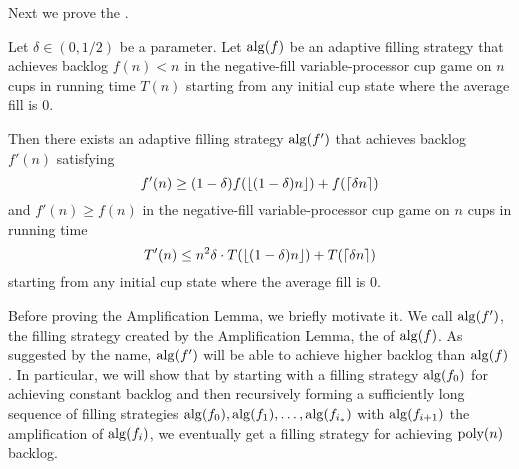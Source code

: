 
Next we prove the .
\begin{lemma}\label{lem:adaptiveAmplification}
  Let $\delta\in(0,1/2)$ be a parameter.
  Let $\operatorname{\text{\textup{alg}}}(f)$ be an adaptive filling strategy that 
  achieves backlog $f(n) < n$ in the negative-fill variable-processor cup game
  on $n$ cups in running time $T(n)$ starting from any initial
  cup state where the average fill is $0$.

  Then there exists an adaptive filling strategy $\operatorname{\text{\textup{alg}}}(f')$ that
  achieves backlog $f'(n)$ satisfying 
  $$f'(n) \ge (1-\delta)f(\left\lfloor (1-\delta)n \right\rfloor) + f(\left\lceil \delta n \right\rceil) $$
  and $f'(n) \ge f(n)$
  in the negative-fill variable-processor cup game on $n$ cups in running time 
  $$T'(n) \le n^2 \delta \cdot T(\left\lfloor (1-\delta)n \right\rfloor) + T(\left\lceil \delta n \right\rceil)$$
  starting from any initial cup state where the average fill is $0$.
\end{lemma}

Before proving the Amplification Lemma, we briefly motivate it. 
We call $\operatorname{\text{\textup{alg}}}(f')$, the filling strategy created by the Amplification
Lemma, the  of $\operatorname{\text{\textup{alg}}}(f)$.
As suggested by the name, $\operatorname{\text{\textup{alg}}}(f')$ will be able to achieve
higher backlog than $\operatorname{\text{\textup{alg}}}(f)$. In particular, we
will show that by starting with a filling strategy $\operatorname{\text{\textup{alg}}}(f_0)$ for achieving
constant backlog and then recursively forming a sufficiently
long sequence of filling strategies $\operatorname{\text{\textup{alg}}}(f_0), \operatorname{\text{\textup{alg}}}(f_1),
\ldots, \operatorname{\text{\textup{alg}}}(f_{i_*})$ with
$\operatorname{\text{\textup{alg}}}(f_{i+1})$ the amplification of $\operatorname{\text{\textup{alg}}}(f_i)$, we eventually
get a filling strategy for achieving $\operatorname{\text{poly}}(n)$ backlog.
  
